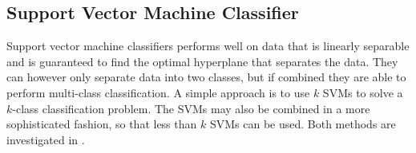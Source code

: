 \subsection{Support Vector Machine Classifier}
Support vector machine classifiers performs well on data that is linearly separable and is guaranteed to find the optimal hyperplane that separates the data. They can however only separate data into two classes, but if combined they are able to perform multi-class classification. A simple approach is to use $k$ SVMs to solve a $k$-class classification problem. The SVMs may also be combined in a more sophisticated fashion, so that less than $k$ SVMs can be used. Both methods are investigated in \cite{Mayoras99SVM}.